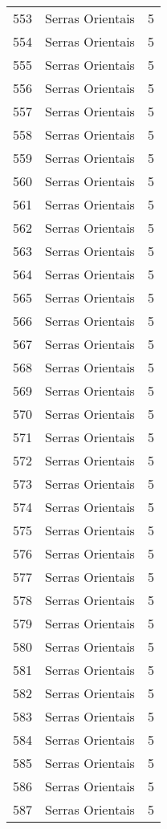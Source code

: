 \begin{table}[p]
\begin{tabular}{rlr}
  553 & Serras Orientais &   5 \\ 
  554 & Serras Orientais &   5 \\ 
  555 & Serras Orientais &   5 \\ 
  556 & Serras Orientais &   5 \\ 
  557 & Serras Orientais &   5 \\ 
  558 & Serras Orientais &   5 \\ 
  559 & Serras Orientais &   5 \\ 
  560 & Serras Orientais &   5 \\ 
  561 & Serras Orientais &   5 \\ 
  562 & Serras Orientais &   5 \\ 
  563 & Serras Orientais &   5 \\ 
  564 & Serras Orientais &   5 \\ 
  565 & Serras Orientais &   5 \\ 
  566 & Serras Orientais &   5 \\ 
  567 & Serras Orientais &   5 \\ 
  568 & Serras Orientais &   5 \\ 
  569 & Serras Orientais &   5 \\ 
  570 & Serras Orientais &   5 \\ 
  571 & Serras Orientais &   5 \\ 
  572 & Serras Orientais &   5 \\ 
  573 & Serras Orientais &   5 \\ 
  574 & Serras Orientais &   5 \\ 
  575 & Serras Orientais &   5 \\ 
  576 & Serras Orientais &   5 \\ 
  577 & Serras Orientais &   5 \\ 
  578 & Serras Orientais &   5 \\ 
  579 & Serras Orientais &   5 \\ 
  580 & Serras Orientais &   5 \\ 
  581 & Serras Orientais &   5 \\ 
  582 & Serras Orientais &   5 \\ 
  583 & Serras Orientais &   5 \\ 
  584 & Serras Orientais &   5 \\ 
  585 & Serras Orientais &   5 \\ 
  586 & Serras Orientais &   5 \\ 
  587 & Serras Orientais &   5 \\ 

\end{tabular}
\end{table}
